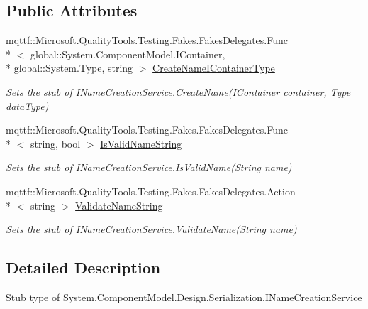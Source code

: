 \subsection*{Public Attributes}
\begin{DoxyCompactItemize}
\item 
mqttf\-::\-Microsoft.\-Quality\-Tools.\-Testing.\-Fakes.\-Fakes\-Delegates.\-Func\\*
$<$ global\-::\-System.\-Component\-Model.\-I\-Container, \\*
global\-::\-System.\-Type, string $>$ \hyperlink{class_system_1_1_component_model_1_1_design_1_1_serialization_1_1_fakes_1_1_stub_i_name_creation_service_a89bcc2393289c03de56e7a90c45670e5}{Create\-Name\-I\-Container\-Type}
\begin{DoxyCompactList}\small\item\em Sets the stub of I\-Name\-Creation\-Service.\-Create\-Name(\-I\-Container container, Type data\-Type)\end{DoxyCompactList}\item 
mqttf\-::\-Microsoft.\-Quality\-Tools.\-Testing.\-Fakes.\-Fakes\-Delegates.\-Func\\*
$<$ string, bool $>$ \hyperlink{class_system_1_1_component_model_1_1_design_1_1_serialization_1_1_fakes_1_1_stub_i_name_creation_service_a09bf41a17679901b76e5ce991fb5e859}{Is\-Valid\-Name\-String}
\begin{DoxyCompactList}\small\item\em Sets the stub of I\-Name\-Creation\-Service.\-Is\-Valid\-Name(\-String name)\end{DoxyCompactList}\item 
mqttf\-::\-Microsoft.\-Quality\-Tools.\-Testing.\-Fakes.\-Fakes\-Delegates.\-Action\\*
$<$ string $>$ \hyperlink{class_system_1_1_component_model_1_1_design_1_1_serialization_1_1_fakes_1_1_stub_i_name_creation_service_a3dcee52c32a1d2af621fcb9e412ca494}{Validate\-Name\-String}
\begin{DoxyCompactList}\small\item\em Sets the stub of I\-Name\-Creation\-Service.\-Validate\-Name(\-String name)\end{DoxyCompactList}\end{DoxyCompactItemize}


\subsection{Detailed Description}
Stub type of System.\-Component\-Model.\-Design.\-Serialization.\-I\-Name\-Creation\-Service



